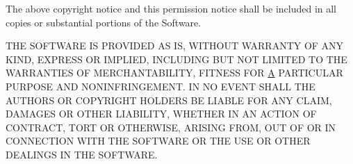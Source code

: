 The above copyright notice and this permission notice shall be included in all copies or substantial portions of the Software.

T\+H\+E S\+O\+F\+T\+W\+A\+R\+E I\+S P\+R\+O\+V\+I\+D\+E\+D \textquotesingle{}A\+S I\+S\textquotesingle{}, W\+I\+T\+H\+O\+U\+T W\+A\+R\+R\+A\+N\+T\+Y O\+F A\+N\+Y K\+I\+N\+D, E\+X\+P\+R\+E\+S\+S O\+R I\+M\+P\+L\+I\+E\+D, I\+N\+C\+L\+U\+D\+I\+N\+G B\+U\+T N\+O\+T L\+I\+M\+I\+T\+E\+D T\+O T\+H\+E W\+A\+R\+R\+A\+N\+T\+I\+E\+S O\+F M\+E\+R\+C\+H\+A\+N\+T\+A\+B\+I\+L\+I\+T\+Y, F\+I\+T\+N\+E\+S\+S F\+O\+R \hyperlink{class_a}{A} P\+A\+R\+T\+I\+C\+U\+L\+A\+R P\+U\+R\+P\+O\+S\+E A\+N\+D N\+O\+N\+I\+N\+F\+R\+I\+N\+G\+E\+M\+E\+N\+T. I\+N N\+O E\+V\+E\+N\+T S\+H\+A\+L\+L T\+H\+E A\+U\+T\+H\+O\+R\+S O\+R C\+O\+P\+Y\+R\+I\+G\+H\+T H\+O\+L\+D\+E\+R\+S B\+E L\+I\+A\+B\+L\+E F\+O\+R A\+N\+Y C\+L\+A\+I\+M, D\+A\+M\+A\+G\+E\+S O\+R O\+T\+H\+E\+R L\+I\+A\+B\+I\+L\+I\+T\+Y, W\+H\+E\+T\+H\+E\+R I\+N A\+N A\+C\+T\+I\+O\+N O\+F C\+O\+N\+T\+R\+A\+C\+T, T\+O\+R\+T O\+R O\+T\+H\+E\+R\+W\+I\+S\+E, A\+R\+I\+S\+I\+N\+G F\+R\+O\+M, O\+U\+T O\+F O\+R I\+N C\+O\+N\+N\+E\+C\+T\+I\+O\+N W\+I\+T\+H T\+H\+E S\+O\+F\+T\+W\+A\+R\+E O\+R T\+H\+E U\+S\+E O\+R O\+T\+H\+E\+R D\+E\+A\+L\+I\+N\+G\+S I\+N T\+H\+E S\+O\+F\+T\+W\+A\+R\+E. 
